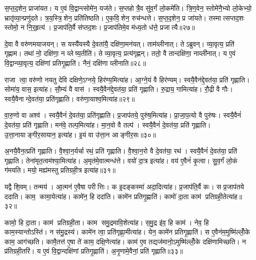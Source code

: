 स॒प्त॒द॒शेन॒ प्राजा॑यत।
य ए॒वं वि॒द्वान्त्सोमे॑न॒ यज॑ते।
स॒प्तहोत्रै॒व सु॑व॒र्गं लो॒कमे॑ति।
त्रि॒ण॒वेन॒ स्तोमे॑नै॒भ्यो लो॒केभ्यो॒ भ्रातृ॑व्या॒न्प्रणु॑दते।
त्र॒य॒स्त्रि॒शेन॒ प्रति॑तिष्ठति।
ए॒क॒वि॒शेन॒ रुच॑न्धत्ते।
स॒प्त॒द॒शेन॒ प्र जा॑यते।
तस्मात्सप्तद॒शः स्तोमो॒ न नि॒र्॒हृत्य॑।
प्र॒जाप॑ति॒र्वै स॑प्तद॒शः।
प्र॒जाप॑तिमे॒व म॑ध्य॒तो ध॑त्ते॒ प्रजात्यै॥२७॥\anuvakamend[अ॒न॒न्द॒द्भुव॒ इति॒ व्याह॑र॒द्वेदा॑सी॒द्वेदा॑धत्त॒ प्रजात्यै]

दे॒वा वै वरु॑णमयाजयन्।
स यस्यै॑यस्यै दे॒वता॑यै॒ दक्षि॑णा॒मन॑यत्।
ताम॑व्लीनात्।
तेऽब्रुवन्।
व्या॒वृत्य॒ प्रति॑ गृह्णाम।
तथा॑ नो॒ दक्षि॑णा॒ न व्लेष्य॒तीति॑।
ते व्या॒वृत्य॒ प्रत्य॑गृह्णन्।
ततो॒ वै तान्दक्षि॑णा॒ नाव्ली॑नात्।
य ए॒वं वि॒द्वान्व्या॒वृत्य॒ दक्षि॑णां प्रतिगृ॒ह्णाति॑।
नैनं॒ दक्षि॑णा व्लीनाति॥२८॥

राजा त्वा॒ वरु॑णो नयतु देवि दक्षिणे॒ऽग्नये॒ हिर॑ण्य॒मित्या॑ह।
आ॒ग्ने॒यं वै हिर॑ण्यम्।
स्वयै॒वैन॑द्दे॒वत॑या॒ प्रति॑ गृह्णाति।
सोमा॑य॒ वास॒ इत्या॑ह।
सौ॒म्यं वै वास॑।
स्वयै॒वैन॑द्दे॒वत॑या॒ प्रति॑ गृह्णाति।
रु॒द्राय॒ गामित्या॑ह।
रौ॒द्री वै गौः।
स्वयै॒वैनान्दे॒वत॑या॒ प्रति॑गृह्णाति।
वरु॑णा॒याश्व॒मित्या॑ह॥२९॥

वा॒रु॒णो वा अश्व॑।
स्वयै॒वैनं॑ दे॒वत॑या॒ प्रति॑गृह्णाति।
प्र॒जाप॑तये॒ पुरु॑ष॒मित्या॑ह।
प्रा॒जा॒प॒त्यो वै पुरु॑षः।
स्वयै॒वैनं॑ दे॒वत॑या॒ प्रति॑ गृह्णाति।
मन॑वे॒ तल्प॒मित्या॑ह।
मा॒न॒वो वै तल्प॑।
स्वयै॒वैनं॑ दे॒वत॑या॒ प्रति॑ गृह्णाति।
उ॒त्ता॒नायाङ्गीर॒सायान॒ इत्या॑ह।
इ॒यं वा उ॑त्ता॒न आङ्गीर॒सः॥३०॥

अ॒नयै॒वैन॒त्प्रति॑ गृह्णाति।
वै॒श्वा॒न॒र्यर्चा रथं॒ प्रति॑ गृह्णाति।
वै॒श्वा॒न॒रो वै दे॒वत॑या॒ रथ॑।
स्वयै॒वैनं॑ दे॒वत॑या॒ प्रति॑ गृह्णाति।
तेना॑मृत॒त्वम॑श्या॒मित्या॑ह।
अ॒मृत॑मे॒वात्मन्ध॑त्ते।
वयो॑ दा॒त्र इत्या॑ह।
वय॑ ए॒वैनं॑ कृ॒त्वा।
सु॒व॒र्गं लो॒कं ग॑मयति।
मयो॒ मह्य॑मस्तु प्रतिग्रही॒त्र इत्या॑ह॥३१॥

यद्वै शि॒वम्।
तन्मय॑।
आ॒त्मन॑ ए॒वैषा परीत्तिः।
क इ॒दङ्कस्मा॑ अदा॒दित्या॑ह।
प्र॒जाप॑ति॒र्वै कः।
स प्र॒जाप॑तये ददाति।
काम॒ कामा॒येत्या॑ह।
कामे॑न॒ हि ददा॑ति।
कामे॑न प्रतिगृ॒ह्णाति॑।
कामो॑ दा॒ता काम॑ प्रतिग्रही॒तेत्या॑ह॥३२॥

कामो॒ हि दा॒ता।
काम॑ प्रतिग्रही॒ता।
काम समु॒द्रमावि॒शेत्या॑ह।
स॒मु॒द्र इ॑व॒ हि काम॑।
नेव॒ हि काम॒स्यान्तोऽस्ति॑।
न स॑मु॒द्रस्य॑।
कामे॑न त्वा॒ प्रति॑गृह्णा॒मीत्या॑ह।
येन॒ कामे॑न प्रतिगृ॒ह्णाति॑।
स ए॒वैन॑म॒मुष्मि॑ल्लोँ॒के काम॒ आग॑च्छति।
कामै॒तत्त॑ ए॒षा ते॑ काम॒ दक्षि॒णेत्या॑ह।
काम॑ ए॒व तद्यज॑मानो॒ऽमुष्मि॑ल्लोँ॒के दक्षि॑णामिच्छति।
न प्र॑तिग्रही॒तरि॑।
य ए॒वं वि॒द्वान्दक्षि॑णां प्रतिगृ॒ह्णाति॑।
अ॒नृ॒णामे॒वैनां॒ प्रति॑ गृह्णाति॥३३॥\anuvakamend[व्ली॒ना॒त्यश्व॒मित्या॑हाङ्गीर॒सः प्र॑तिग्रही॒त्र इत्या॑ह प्रतिग्रही॒तेत्या॑ह॒ दक्षि॒णेत्या॑ह च॒त्वारि॑ च]

